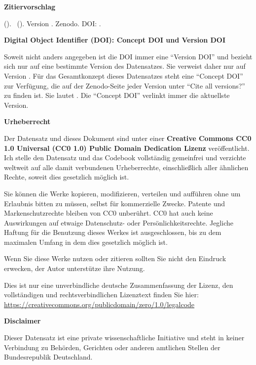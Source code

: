 \textbf{Zitiervorschlag}

\emph{\projectauthor} (\the\year ). \datatitle\ (\datashort ). Version \version . Zenodo. DOI: \dataversiondoi .


\vspace{0.5cm}


\textbf{Digital Object Identifier (DOI): Concept DOI und Version DOI}

Soweit nicht anders angegeben ist die DOI immer eine \enquote{Version DOI} und bezieht sich nur auf eine bestimmte Version des Datensatzes. Sie verweist daher nur auf Version \version . Für das Gesamtkonzept dieses Datensatzes steht eine \enquote{Concept DOI} zur Verfügung, die auf der Zenodo-Seite jeder Version unter \enquote{Cite all versions?} zu finden ist. Sie lautet \dataconceptdoi . Die \enquote{Concept DOI} verlinkt immer die aktuellste Version.


\vspace{0.5cm}


\textbf{Urheberrecht}

Der Datensatz und dieses Dokument sind unter einer \textbf{Creative Commons CC0 1.0 Universal (CC0 1.0) Public Domain Dedication Lizenz} veröffentlicht. Ich stelle den Datensatz und das Codebook vollständig gemeinfrei und verzichte weltweit auf alle damit verbundenen Urheberrechte, einschließlich aller ähnlichen Rechte, soweit dies gesetzlich möglich ist. 

Sie können die Werke kopieren, modifizieren, verteilen und aufführen ohne um Erlaubnis bitten zu müssen, selbst für kommerzielle Zwecke. Patente und Markenschutzrechte bleiben von CC0 unberührt. CC0 hat auch keine Auswirkungen auf etwaige Datenschutz- oder Persönlichkeitsrechte. Jegliche Haftung für die Benutzung dieses Werkes ist ausgeschlossen, bis zu dem maximalen Umfang in dem dies gesetzlich möglich ist. 

Wenn Sie diese Werke nutzen oder zitieren sollten Sie nicht den Eindruck erwecken, der Autor unterstütze ihre Nutzung.

Dies ist nur eine unverbindliche deutsche Zusammenfassung der Lizenz, den vollständigen und rechtsverbindlichen Lizenztext finden Sie hier: \url{https://creativecommons.org/publicdomain/zero/1.0/legalcode}


\vspace{0.5cm}

\textbf{Disclaimer} 

Dieser Datensatz ist eine private wissenschaftliche Initiative und steht in keiner Verbindung zu Behörden, Gerichten oder anderen amtlichen Stellen der Bundesrepublik Deutschland.

\newpage